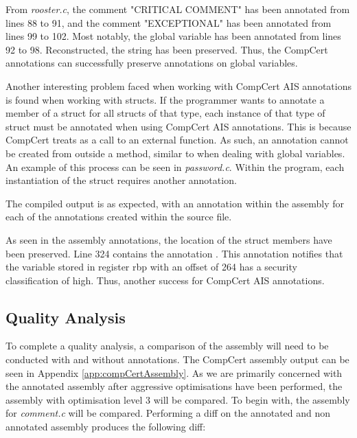 

From \textit{rooster.c}, the comment "CRITICAL COMMENT" has been annotated from lines 88 to 91, and the comment "EXCEPTIONAL" has been annotated from lines 99 to 102. Most notably, the global variable  has been annotated from lines 92 to 98. Reconstructed, the string  has been preserved. Thus, the CompCert annotations can successfully preserve annotations on global variables.


Another interesting problem faced when working with CompCert AIS annotations is found when working with structs. If the programmer wants to annotate a member of a struct for all structs of that type, each instance of that type of struct must be annotated when using CompCert AIS annotations. This is because CompCert treats  as a call to an external function. As such, an annotation cannot be created from outside a method, similar to when dealing with global variables. An example of this process can be seen in \textit{password.c}. Within the program, each instantiation of the struct  requires another annotation. 



The compiled output is as expected, with an annotation within the assembly for each of the annotations created within the source file.



As seen in the assembly annotations, the location of the struct members have been preserved. Line 324 contains the annotation . This annotation notifies that the variable stored in register rbp with an offset of 264 has a security classification of high. Thus, another success for CompCert AIS annotations.

\subsection{Quality Analysis}
To complete a quality analysis, a comparison of the assembly will need to be conducted with and without annotations. The CompCert assembly output can be seen in Appendix \ref{app:compCertAssembly}. As we are primarily concerned with the annotated assembly after aggressive optimisations have been performed, the assembly with optimisation level 3 will be compared. To begin with, the assembly for \textit{comment.c} will be compared. Performing a diff on the annotated and non annotated assembly produces the following diff:

